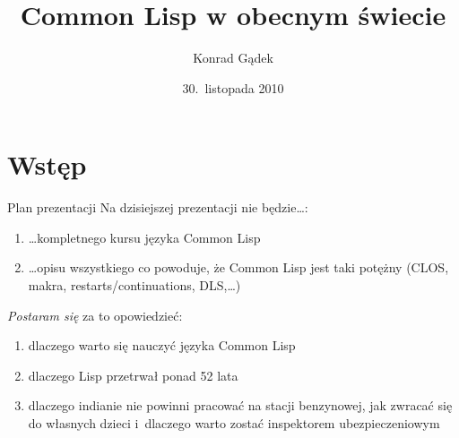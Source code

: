 \documentclass{beamer}
\author{Konrad Gądek}
\institute[AGH]{Akademia Górniczo-Hutnicza}
\date{30.~listopada 2010}
\title{Common Lisp w obecnym świecie}
\begin{document}

\begin{frame}[plain]
	\titlepage
\end{frame}

\section*{Wstęp}
\begin{frame}{Plan prezentacji}
	Na dzisiejszej prezentacji nie będzie\ldots:
	\begin{enumerate}
		\item{\ldots kompletnego kursu języka Common Lisp}
		\item{\ldots opisu wszystkiego co powoduje, że Common Lisp jest
			taki potężny (CLOS, makra, restarts/continuations, DLS,\ldots)}
	\end{enumerate}
	\emph{Postaram się} za to opowiedzieć:
	\begin{enumerate}
		\item{dlaczego warto się nauczyć języka Common Lisp}
		\pause \item{dlaczego Lisp przetrwał ponad 52 lata}
		\pause \item{dlaczego indianie nie powinni pracować na
					stacji benzynowej, jak zwracać się do
					własnych dzieci i~dlaczego warto zostać
					inspektorem ubezpieczeniowym}
	\end{enumerate}
\end{frame}
\end{document}
